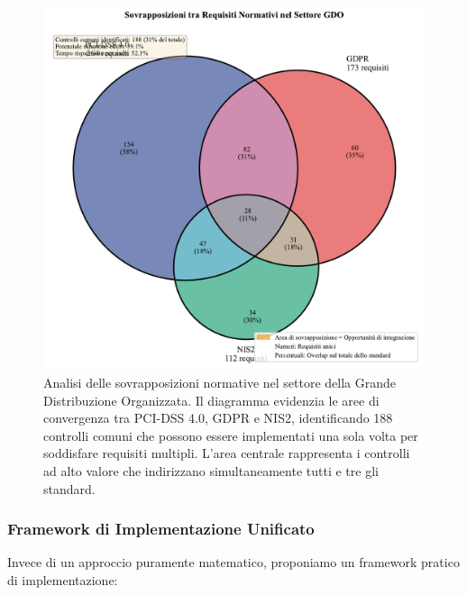 \begin{figure}[htbp]
\centering
\includegraphics[width=1\textwidth]{thesis_figures/cap4/figura_4_1_venn_normative.pdf}
\caption{Analisi delle sovrapposizioni normative nel settore della Grande Distribuzione Organizzata. Il diagramma evidenzia le aree di convergenza tra PCI-DSS 4.0, GDPR e NIS2, identificando 188 controlli comuni che possono essere implementati una sola volta per soddisfare requisiti multipli. L'area centrale rappresenta i controlli ad alto valore che indirizzano simultaneamente tutti e tre gli standard.}
\label{fig:venn_normative}
\end{figure}

\subsubsection{Framework di Implementazione Unificato}

Invece di un approccio puramente matematico, proponiamo un framework pratico di implementazione:

